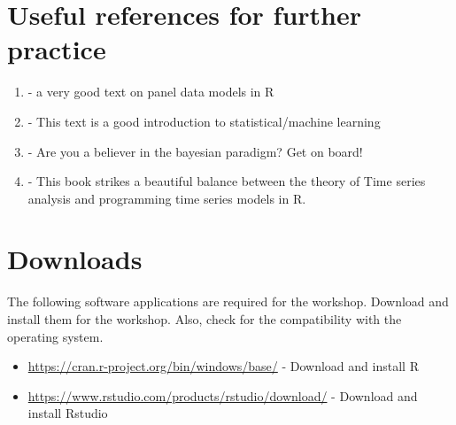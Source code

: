 \documentclass[12pt,a4paper]{article}
\begin{document}
	\section*{Useful references for further practice}
	\begin{enumerate}[label=(\alph*)]
		\item \cite{croissant2018panel} - a very good text on panel data models in R
		\item \cite{james2013introduction} - This text is a good introduction to statistical/machine learning
		\item  \cite{albert2009bayesian} - Are you a believer in the bayesian paradigm? Get on board!
		\item \cite{shumway2006time} - This book strikes a beautiful balance between the theory of Time series analysis and programming time series models in R.
	\end{enumerate}
	
	\section*{Downloads}
	The following software applications are required for the workshop. Download and install them for the workshop. Also, check for the compatibility with the operating system.
	\begin{itemize}
		\item \url{https://cran.r-project.org/bin/windows/base/} - Download and install R
		\item \url{https://www.rstudio.com/products/rstudio/download/} - Download and install Rstudio
	\end{itemize}
\end{document}

